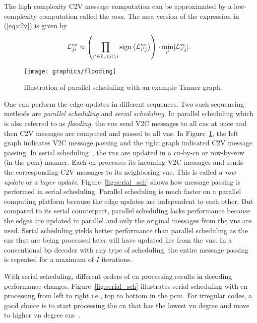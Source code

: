 The high complexity C2V message computation can be approximated by a low-complexity computation called the \emph{\acrlong{msa}}. The \gls{msa} version of the expression in (\ref{eq:c2v}) is given by
\begin{align}\label{eq:msa}
\mathcal{L}^{\mathrm{cv}}_{ji}\approx\left(\prod_{i^\prime\in\mathcal{E}_c(j)\backslash i}\operatorname{sign}\left(\mathcal{L}^{\mathrm{vc}}_{i^\prime j}\right)\right)\cdot\min_{i^\prime}\lvert\mathcal{L}^{\mathrm{vc}}_{i^\prime j}\rvert.
\end{align}

\begin{figure}[htbp]
  \centering
  \texttt{[image: graphics/flooding]}
  \caption[Illustration of parallel scheduling.]{Illustration of parallel scheduling with an example Tanner graph.}
  \label{fig:flooding}
\end{figure}

One can perform the edge updates in different sequences. Two such sequencing methods are \emph{parallel scheduling} and \emph{serial scheduling}. In parallel scheduling which is also referred to as \emph{flooding}, the \glspl{vn} send V2C messages to all \glspl{cn} at once and then C2V messages are computed and passed to all \glspl{vn}. In Figure~\ref{fig:flooding}, the left graph indicates V2C message passing and the right graph indicated C2V message passing. In serial scheduling~\cite{Zhang2002}, the \glspl{vn} are updated in a \gls{cn}-by-\gls{cn} or row-by-row (in the \gls{pcm}) manner. Each \gls{cn} processes its incoming V2C messages and sends the corresponding C2V messages to its neighboring \glspl{vn}. This is called a \emph{row update} or a \emph{layer update}. Figure~\ref{fig:serial_sch} shows how message passing is performed in serial scheduling. Parallel scheduling is much faster on a parallel computing platform because the edge updates are independent to each other. But compared to its serial counterpart, parallel scheduling lacks performance because the edges are updated in parallel and only the original messages from the \glspl{vn} are used. Serial scheduling yields better performance than parallel scheduling as the \glspl{cn} that are being processed later will have updated \glspl{llr} from the \glspl{vn}. In a conventional \gls{bp} decoder with any type of scheduling, the entire message passing is repeated for a maximum of $I$ iterations.

With serial scheduling, different orders of \gls{cn} processing results in decoding performance changes. Figure~\ref{fig:serial_sch} illustrates serial scheduling with \gls{cn} processing from left to right i.e., top to bottom in the \gls{pcm}. For irregular codes, a good choice is to start processing the \gls{cn} that has the lowest \gls{vn} degree and move to higher \gls{vn} degree \glspl{cn}~\cite{Fren1902:Static}.

